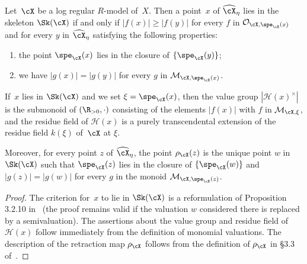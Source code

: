 \begin{prop}\label{prop:maxmon}
Let~$\cX$ be a log regular $R$\nobreakdash-model of~$X$. Then a point~$x$ of $\widehat{\cX}_{\eta}$ lies in the skeleton $\Sk(\cX)$ if and only if
$|f(x)|\geq |f(y)|$ for every $f$ in $\mathcal{O}_{\cX,\spe_{\cX}(x)}$ and for every $y$ in $\widehat{\cX}_{\eta}$ satisfying the following properties:
\begin{enumerate}
\item the point $\spe_{\cX}(x)$ lies in the closure of $\{\spe_{\cX}(y)\}$;
\item we have $|g(x)|=|g(y)|$ for every $g$ in $\mathcal{M}_{\cX,\spe_{\cX}(x)}$.
\end{enumerate}
If~$x$ lies in $\Sk(\cX)$ and we set $\xi=\spe_{\cX}(x)$, then the value group $|\mathscr{H}(x)^{\times}|$ is the submonoid of $(\R_{>0},\cdot)$ consisting of the elements $|f(x)|$ with $f$ in $\mathcal{M}_{\cX,\xi}$, and the residue field of $\mathscr{H}(x)$ is a purely transcendental extension of the residue field $k(\xi)$ of~$\cX$ at $\xi$.

Moreover, for every point $z$ of $\widehat{\cX}_{\eta}$, the point $\rho_{\cX}(z)$ is the unique point $w$ in $\Sk(\cX)$ such that $\spe_{\cX}(z)$ lies in the closure of $\{\spe_{\cX}(w)\}$ and $|g(z)|=|g(w)|$ for every $g$ in the monoid $\mathcal{M}_{\cX,\spe_{\cX}(z)}$.
\end{prop}
\begin{proof}
The criterion for~$x$ to lie in $\Sk(\cX)$ is a reformulation of Proposition 3.2.10 in~\cite{BrMa} (the proof remains valid if the valuation $w$ considered there is replaced by a semivaluation). The assertions about the value group and residue field of $\mathscr{H}(x)$ follow immediately from the definition of monomial valuations.
The description of the retraction map $\rho_{\cX}$ follows from the definition of $\rho_{\cX}$ in \S3.3 of~\cite{BrMa}.
\end{proof}

